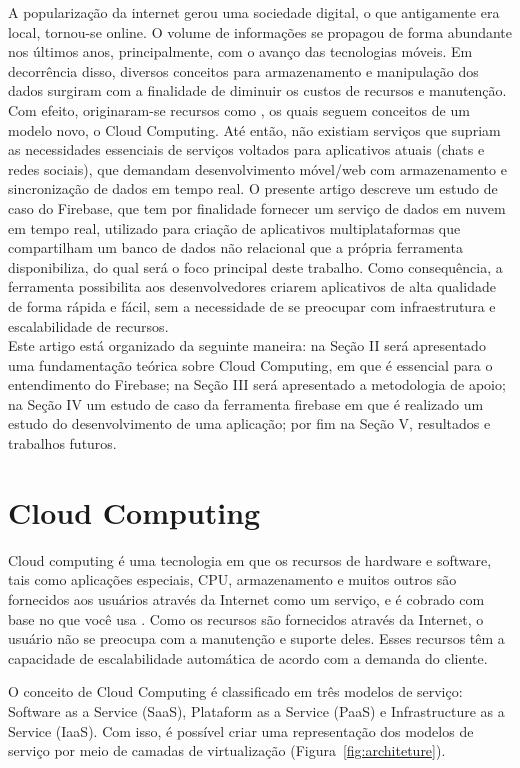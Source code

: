 \documentclass[12pt]{article}
\begin{document}
A popularização da internet gerou uma sociedade digital, o que antigamente era local, tornou-se online. O volume de informações se propagou de forma abundante nos últimos anos, principalmente, com o avanço das tecnologias móveis. Em decorrência disso, diversos conceitos para armazenamento e manipulação dos dados surgiram com a finalidade de diminuir os custos de recursos e manutenção. Com efeito, originaram-se recursos como \cite{WA} \cite{GAE} \cite{AWS}, os quais seguem conceitos de um modelo novo, o Cloud Computing. Até então, não existiam serviços que supriam as necessidades essenciais de serviços voltados para aplicativos atuais (chats e redes sociais), que demandam desenvolvimento móvel/web com armazenamento e sincronização de dados em tempo real. O presente artigo descreve um estudo de caso do Firebase, que tem por finalidade fornecer um serviço de dados em nuvem em tempo real, utilizado para criação de aplicativos multiplataformas que compartilham um banco de dados não relacional que a própria ferramenta disponibiliza, do qual será o foco principal deste trabalho. Como consequência, a ferramenta possibilita aos desenvolvedores criarem aplicativos de alta qualidade de forma rápida e fácil, sem a necessidade de se preocupar com infraestrutura e escalabilidade de recursos.
\\
Este artigo está organizado da seguinte maneira: na Seção II será apresentado uma fundamentação teórica sobre Cloud Computing, em que é essencial para o entendimento do Firebase; na Seção III será apresentado a metodologia de apoio; na Seção IV um estudo de caso da ferramenta firebase em que é realizado um estudo do desenvolvimento de uma aplicação; por fim na Seção V, resultados e trabalhos futuros.

\section{Cloud Computing} \label{sec:firstpage}

Cloud computing é uma tecnologia em que os recursos de hardware e software, tais como aplicações especiais, CPU, armazenamento e muitos outros são fornecidos aos usuários através da Internet como um serviço, e é cobrado com base no que você usa \cite{1}. Como os recursos são fornecidos através da Internet, o usuário não se preocupa com a manutenção e suporte deles. Esses recursos têm a capacidade de escalabilidade automática de acordo com a demanda do cliente. 

O conceito de Cloud Computing é classificado em três modelos de serviço: Software as a Service (SaaS), Plataform as a Service (PaaS) e Infrastructure as a Service (IaaS). Com isso, é possível criar uma representação dos modelos de serviço por meio de camadas de virtualização (Figura~\ref{fig:architeture}).
\end{document}
